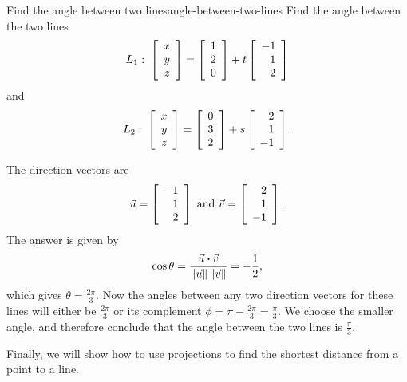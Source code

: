 \documentclass{ximera}
\begin{document}
\begin{example}{Find the angle between two lines}{angle-between-two-lines}
  Find the angle between the two lines%
  \begin{equation*}
    L_1:  \;
    \startmat{r} x \\ y \\ z \stopmat
    = \startmat{r} 1 \\ 2 \\ 0 \stopmat
    + t \startmat{r} -1 \\ 1 \\ 2 \stopmat
  \end{equation*}
  and
  \begin{equation*}
    L_2: \;
    \startmat{r} x \\ y \\ z \stopmat
    = \startmat{r} 0 \\ 3 \\ 2 \stopmat
    + s \startmat{r} 2 \\ 1 \\ -1 \stopmat.
  \end{equation*}
\end{example}

\begin{solution}
  The direction vectors are
  \begin{equation*}
    \vect{u}=\startmat{r} -1 \\ 1 \\ 2 \stopmat
    \quad\mbox{and}\quad
    \vect{v}=\startmat{r} 2 \\ 1 \\ -1 \stopmat.
  \end{equation*}
  The answer is given by
  \begin{equation*}
    \cos\theta =
    \frac{\vect{u}\dotprod\vect{v}}{\norm{\vect{u}}\norm{\vect{v}}} = -\frac{1}{2},
  \end{equation*}
  which gives $\theta=\frac{2\pi}{3}$.  Now the angles between any two
  direction vectors for these lines will either be $\frac{2 \pi}{3}$ or
  its complement $\phi = \pi - \frac{2 \pi}{3} = \frac{\pi}{3}$. We
  choose the smaller angle, and therefore conclude that the angle
  between the two lines is $\frac{\pi}{3}$.
\end{solution}



Finally, we will show how to use projections to find the shortest
distance from a point to a line.
\end{document}
